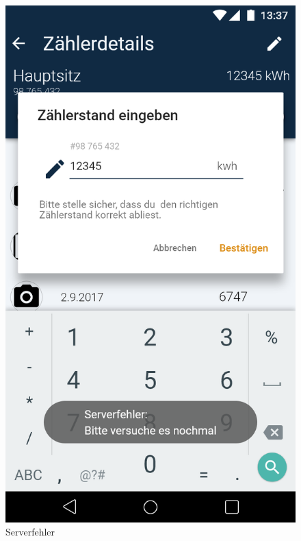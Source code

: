 \begin{figure}[h]
	\includegraphics[scale = 0.22]{img/AndroidMockup/serverException}		
	\caption{Serverfehler}
	\label{fig:mock-pw}
\end{figure}

